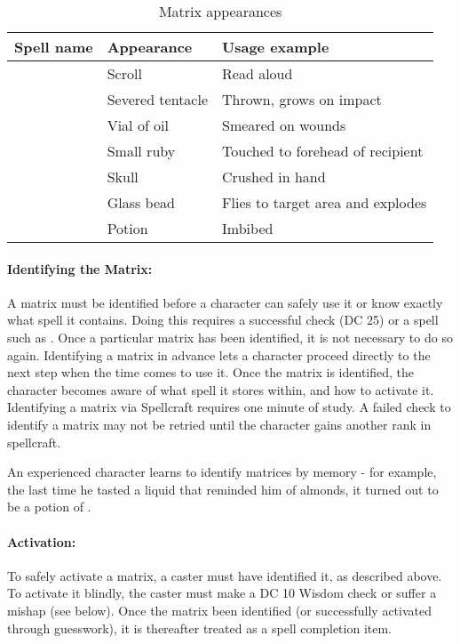 \begin{table*}
\caption{Matrix appearances}
\label{tab:MatrixAppearances}
\centering
\begin{tabular}{|l|l|l|}
\hline
\textbf{Spell name}&\textbf{Appearance}&\textbf{Usage example}\\
\hline
\nameref{Spell:AlignedProtection}&Scroll	&Read aloud\\
\nameref{Spell:BlackTentacles}	&Severed tentacle&Thrown, grows on impact\\
\nameref{Spell:CureWounds}	&Vial of oil 	&Smeared on wounds\\
\nameref{Spell:CureWounds}	&Small ruby 	&Touched to forehead of recipient\\
\nameref{Spell:DivinePower}	&Skull		&Crushed in hand\\
\nameref{Spell:Fireball}	&Glass bead	&Flies to target area and explodes\\
\nameref{Spell:RemoveDisease}	&Potion		&Imbibed\\
\hline
\end{tabular}
\end{table*}

\paragraph{Identifying the Matrix:} 
A matrix must be identified before a character can safely use it or know exactly what spell it contains. 
Doing this requires a successful  check (DC 25) or a spell such as . 
Once a particular matrix has been identified, it is not necessary to do so again. 
Identifying a matrix in advance lets a character proceed directly to the next step when the time comes to use it.
Once the matrix is identified, the character becomes aware of what spell it stores within, and how to activate it. 
Identifying a matrix via Spellcraft requires one minute of study.
A failed check to identify a matrix may not be retried until the character gains another rank in spellcraft.

An experienced character learns to identify matrices by memory - for example, the last time he tasted a liquid that reminded him of almonds, it turned out to be a potion of .

\paragraph{Activation:} 
To safely activate a matrix, a caster must have identified it, as described above.
To activate it blindly, the caster must make a DC 10 Wisdom check or suffer a mishap (see below).
Once the matrix been identified (or successfully activated through guesswork), it is thereafter treated as a spell completion item.

